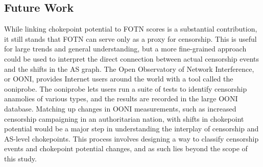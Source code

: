 \subsection{Future Work}
While linking chokepoint potential to FOTN scores is a substantial contribution, it still stands that FOTN can serve only as a proxy for censorship.
This is useful for large trends and general understanding, but a more fine-grained approach could be used to interpret the direct connection between
actual censorship events and the shifts in the AS graph. The Open Observatory of Network Interference, or OONI, \cite{OONI} provides Internet users around
the world with a tool called the ooniprobe. The ooniprobe lets users run a suite of tests to identify censorship anamolies of various types, and the results are
recorded in the large OONI database. Matching up changes in OONI measurements, such as increased censorship campaigning in an authoritarian nation, with shifts
in chokepoint potential would be a major step in understanding the interplay of censorship and AS-level chokepoints. This process involves designing a way to classify
censorship events and chokepoint potential changes, and as such lies beyond the scope of this study.
